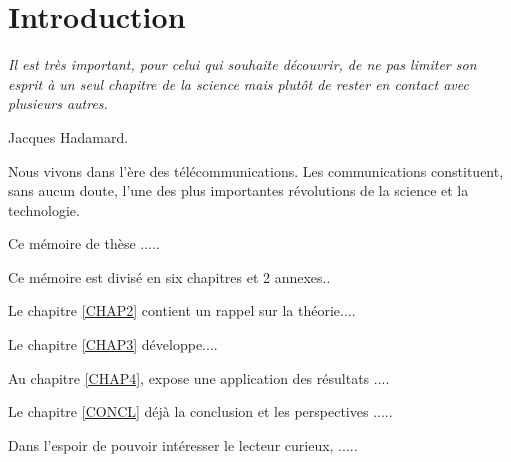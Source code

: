 \chapter{Introduction} \label{INTRO}
\smallskip
\hfill
\begin{minipage}[b]{8cm}
{\it Il est tr\`es important, pour celui qui souhaite d\'ecouvrir, de ne pas limiter son esprit \`a un seul chapitre de la
science mais plut\^ot de rester en contact avec plusieurs autres.}
\end{minipage}
\begin{flushright} Jacques Hadamard. \end{flushright}
\vskip 2cm

{\Huge N}ous vivons dans l'\`ere des t\'el\'ecommunications. Les communications constituent, sans aucun doute, l'une des plus importantes r\'evolutions de la science et la technologie.
\medskip

Ce m\'emoire de th\`ese .....
\bigskip

Ce m\'emoire est divis\'e en six chapitres et 2 annexes.. \medskip


Le chapitre \ref{CHAP2} contient un rappel sur la th\'eorie....  \medskip

Le chapitre \ref{CHAP3} d\'eveloppe....  \medskip

Au chapitre \ref{CHAP4}, expose une application des r\'esultats ....  \medskip

Le chapitre \ref{CONCL}  d\'ej\`a la conclusion et les perspectives .....\medskip

Dans l'espoir de pouvoir int\'eresser le lecteur curieux, .....


